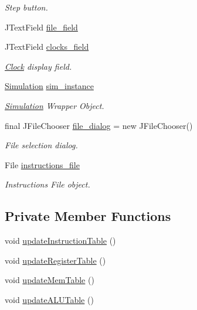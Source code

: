 \begin{DoxyCompactItemize}
\begin{DoxyCompactList}\small\item\em \-Step button. \end{DoxyCompactList}\item 
\-J\-Text\-Field \hyperlink{classTomasuloGUI_a4e028c3179fd14d926d7a1896f844a20}{file\-\_\-field}
\item 
\-J\-Text\-Field \hyperlink{classTomasuloGUI_a518c1f6d1f2fcbc3df0c7fc4cdce7e25}{clocks\-\_\-field}
\begin{DoxyCompactList}\small\item\em \hyperlink{classClock}{\-Clock} display field. \end{DoxyCompactList}\item 
\hyperlink{classSimulation}{\-Simulation} \hyperlink{classTomasuloGUI_a9276faa3fed5236e393b96d517e2e6fc}{sim\-\_\-instance}
\begin{DoxyCompactList}\small\item\em \hyperlink{classSimulation}{\-Simulation} \-Wrapper \-Object. \end{DoxyCompactList}\item 
final \-J\-File\-Chooser \hyperlink{classTomasuloGUI_af5a309a292415fb6deb61903765d8679}{file\-\_\-dialog} = new \-J\-File\-Chooser()
\begin{DoxyCompactList}\small\item\em \-File selection dialog. \end{DoxyCompactList}\item 
\-File \hyperlink{classTomasuloGUI_a84fcf1ebe8e65d62c3c7f90382380946}{instructions\-\_\-file}
\begin{DoxyCompactList}\small\item\em \-Instructions \-File object. \end{DoxyCompactList}\end{DoxyCompactItemize}
\subsection*{\-Private \-Member \-Functions}
\begin{DoxyCompactItemize}
\item 
void \hyperlink{classTomasuloGUI_a65dd25b7e14e954baf4c4a6dfc96a192}{update\-Instruction\-Table} ()
\item 
void \hyperlink{classTomasuloGUI_a69f0c12dd9aef1f080a023b5abe5649e}{update\-Register\-Table} ()
\item 
void \hyperlink{classTomasuloGUI_a1c15ab07a1fde2b9ca5d189fe6d03ffe}{update\-Mem\-Table} ()
\item 
void \hyperlink{classTomasuloGUI_a34218d232187e85c142c686ba01798f6}{update\-A\-L\-U\-Table} ()
\end{DoxyCompactItemize}


